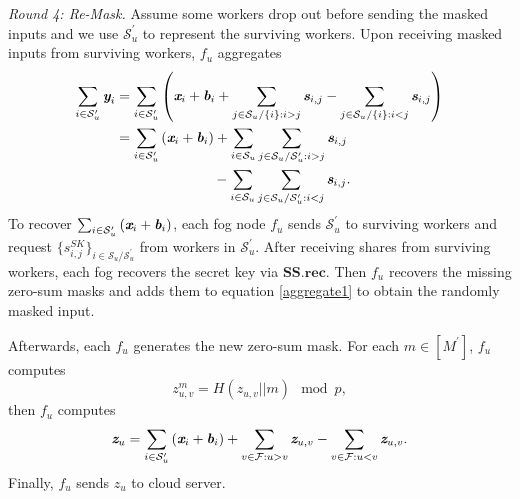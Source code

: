 \documentclass[conference,a4paper]{IEEEtran}
\def\textbi#1{\textbf{\em #1}}
\begin{document}
    {\em Round 4: Re-Mask.} Assume some workers drop out before sending the masked inputs and we use $\mathcal{S}_u^\prime$ to represent the surviving workers. Upon receiving masked inputs from surviving workers, $f_u$ aggregates
    \begin{equation}\label{aggregate1}
    \begin{aligned}
        \sum_{i\in \mathcal{S}_u^\prime} \textbi{y}_i
        &=\sum_{i\in \mathcal{S}_u^\prime} \left( \textbi{x}_i+\textbi{b}_i+\sum_{j\in \mathcal{S}_u/\{i\}:i>j} \textbi{s}_{i,j}-\sum_{j\in \mathcal{S}_u/\{i\}:i<j} \textbi{s}_{i,j}\right)\\
        &=\sum_{i\in \mathcal{S}_u^\prime}\left(\textbi{x}_i+\textbi{b}_i\right)+\sum_{i\in\mathcal{S}_u}\sum_{j\in \mathcal{S}_u/\mathcal{S}_u^\prime:i>j}\textbi{s}_{i,j}\\
        &\quad\qquad\qquad\qquad-\sum_{i\in\mathcal{S}_u}\sum_{j\in \mathcal{S}_u/\mathcal{S}_u^\prime:i<j}\textbi{s}_{i,j}.
    \end{aligned}
    \end{equation}
    To recover $\sum_{i\in \mathcal{S}_u^\prime}\left(\textbi{x}_i+\textbi{b}_i\right)$, each fog node $f_u$ sends $\mathcal{S}_u^\prime$ to surviving workers and request $\{s_{i,j}^{SK}\}_{i\in \mathcal{S}_u/\mathcal{S}_u^\prime}$ from workers in $\mathcal{S}_u^\prime$. After receiving shares from surviving workers, each fog recovers the secret key via $\textbf{SS.rec}$. Then $f_u$ recovers the missing zero-sum masks and adds them to equation \ref{aggregate1} to obtain the randomly masked input.

    Afterwards, each $f_u$ generates the new zero-sum mask. For each $m\in [M^\prime]$, $f_u$ computes
    \begin{equation}\nonumber
      z_{u,v}^m=H(z_{u,v}||m)\mod{p},
    \end{equation}
    then $f_u$ computes
    \begin{equation}\nonumber
      \textbi{z}_u=\sum_{i\in \mathcal{S}_u^\prime} \left(\textbi{x}_i+\textbi{b}_i\right)+\sum_{v\in \mathcal{F}:u>v} \textbi{z}_{u,v}-\sum_{v\in \mathcal{F}:u<v} \textbi{z}_{u,v}.
    \end{equation}
    Finally, $f_u$ sends $z_u$ to cloud server.\\
\end{document}
